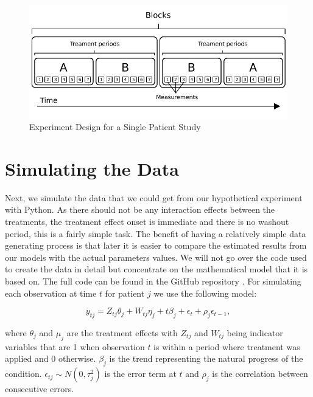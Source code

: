 \documentclass[12pt,a4paper,leqno]{report}
\theoremstyle{plain}
\theoremstyle{definition}
\theoremstyle{remark}
\begin{document}
\begin{figure}[H]
    \centering
    \caption{Experiment Design for a Single Patient Study}\label{singlepatientexperimentdesign}
    \centering
    \includegraphics{design_for_simulated_experiment.pdf}
\end{figure}

\section{Simulating the Data}

Next, we simulate the data that we could get from our hypothetical experiment with Python.
As there should not be any interaction effects between the treatments, the treatment
effect onset is immediate and there is no washout period, this is a fairly simple
task. The benefit of having a relatively simple data generating process is that later it
is easier to compare the estimated results from our models with the actual parameters
values. We will not go over the code used to create the data in detail but concentrate on
the mathematical model that it is based on. The full code can be found in the GitHub repository
\cite{github}. For simulating each observation at time \(t\) for patient \(j\) we use the following model:

\begin{def}\label{simulationmodel}
    \begin{equation}\label{}
        y_{tj} = Z_{tj}\theta_{j} + W_{tj}\eta_{j} + t\beta_j + \epsilon_t + \rho_j\epsilon_{t-1},
    \end{equation}
\end{def}where \(\theta_j\) and \(\mu_j\) are the treatment effects with \(Z_{tj}\) and \(W_{tj}\) being indicator
variables that are 1 when observation \(t\) is within a period where treatment was applied and
0 otherwise. \(\beta_j\) is the trend representing the natural progress of the
condition. \(\epsilon_{tj} \sim N(0,\tau_j^2) \) is the error term at \(t\) and
\(\rho_j\) is the correlation between consecutive errors.
\end{document}
